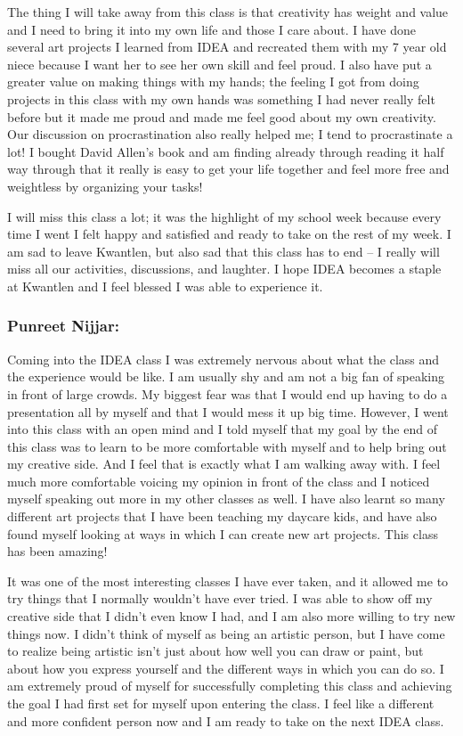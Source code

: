 \documentclass[letterpaper,10pt,headsepline]{scrreprt}
\begin{document}
The thing I will take away from this class is that creativity has weight and value and I need to bring it into my own life and those I care about. I have done several art projects I learned from IDEA and recreated them with my 7 year old niece because I want her to see her own skill and feel proud. I also have put a greater value on making things with my hands; the feeling I got from doing projects in this class with my own hands was something I had never really felt before but it made me proud and made me feel good about my own creativity. Our discussion on procrastination also really helped me; I tend to procrastinate a lot! I bought David Allen's book and am finding already through reading it half way through that it really is easy to get your life together and feel more free and weightless by organizing your tasks!

I will miss this class a lot; it was the highlight of my school week because every time I went I felt happy and satisfied and ready to take on the rest of my week. I am sad to leave Kwantlen, but also sad that this class has to end -- I really will miss all our activities, discussions, and laughter. I hope IDEA becomes a staple at Kwantlen and I feel blessed I was able to experience it.

\subsubsection{Punreet Nijjar:}

Coming into the IDEA class I was extremely nervous about what the class and the experience would be like. I am usually shy and am not a big fan of speaking in front of large crowds. My biggest fear was that I would end up having to do a presentation all by myself and that I would mess it up big time. However, I went into this class with an open mind and I told myself that my goal by the end of this class was to learn to be more comfortable with myself and to help bring out my creative side. And I feel that is exactly what I am walking away with. I feel much more comfortable voicing my opinion in front of the class and I noticed myself speaking out more in my other classes as well. I have also learnt so many different art projects that I have been teaching my daycare kids, and have also found myself looking at ways in which I can create new art projects. This class has been amazing!

It was one of the most interesting classes I have ever taken, and it allowed me to try things that I normally wouldn’t have ever tried. I was able to show off my creative side that I didn’t even know I had, and I am also more willing to try new things now. I didn’t think of myself as being an artistic person, but I have come to realize being artistic isn’t just about how well you can draw or paint, but about how you express yourself and the different ways in which you can do so. I am extremely proud of myself for successfully completing this class and achieving the goal I had first set for myself upon entering the class. I feel like a different and more confident person now and I am ready to take on the next IDEA class.
\end{document}
